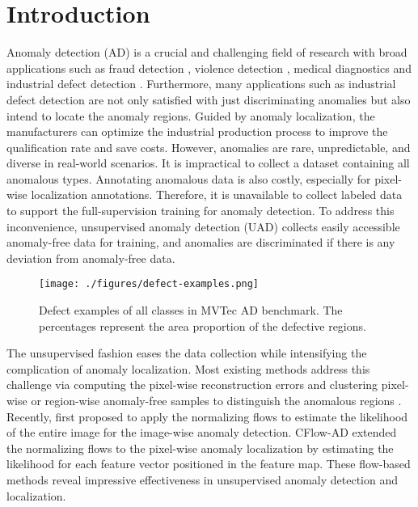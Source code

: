 \documentclass[lettersize,journal]{IEEEtran}
\begin{document}
\section{Introduction}
Anomaly detection (AD) is a crucial and challenging field of research with broad applications such as fraud detection \cite{dal2017credit}, violence detection \cite{sultani2018real}, medical diagnostics \cite{paluru2021anam} and industrial defect detection \cite{bergmann2019mvtec}. 
Furthermore, many applications such as industrial defect detection are not only satisfied with just discriminating anomalies but also intend to locate the anomaly regions. Guided by anomaly localization, the manufacturers can optimize the industrial production process to improve the qualification rate and save costs. 
However, anomalies are rare, unpredictable, and diverse in real-world scenarios. It is impractical to collect a dataset containing all anomalous types. 
Annotating anomalous data is also costly, especially for pixel-wise localization annotations. Therefore, it is unavailable to collect labeled data to support the full-supervision training for anomaly detection. 
To address this inconvenience, 
unsupervised anomaly detection (UAD) collects easily accessible anomaly-free data for training, and anomalies are discriminated if there is any deviation from anomaly-free data. 

\begin{figure}
  \centering
  \texttt{[image: ./figures/defect-examples.png]} 
  \caption{Defect examples of all classes in MVTec AD benchmark. The percentages represent the area proportion of the defective regions.}
  \label{fig:defect-examples}
\end{figure}

The unsupervised fashion eases the data collection while intensifying the complication of anomaly localization. 
Most existing methods address this challenge via computing the pixel-wise reconstruction errors \cite{bergmann2019mvtec, zavrtanik2021riad, marimont2021anomaly, ristea2021self, deng2022distillation} and clustering pixel-wise or region-wise anomaly-free samples to distinguish the anomalous regions \cite{defard2021padim, reiss2021panda, cohen2020spade, roth2021patchcore}. Recently, \cite{rudolph2021differnet} first proposed to apply the normalizing flows \cite{rezende2015variational} to estimate the likelihood of the entire image for the image-wise anomaly detection. CFlow-AD \cite{gudovskiy2022cflow} extended the normalizing flows to the pixel-wise anomaly localization by estimating the likelihood for each feature vector positioned in the feature map. These flow-based methods reveal impressive effectiveness in unsupervised anomaly detection and localization. 
\end{document}
